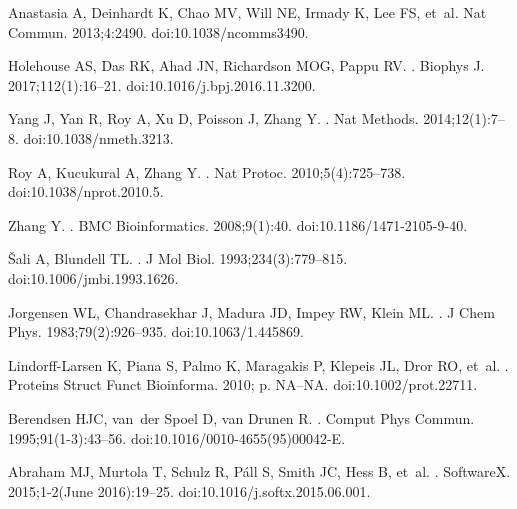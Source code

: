 \documentclass[10pt,letterpaper]{article}
\begin{document}
\begin{thebibliography}{10}
Anastasia A, Deinhardt K, Chao MV, Will NE, Irmady K, Lee FS, et~al.
\newblock Nat Commun. 2013;4:2490.
\newblock doi:{10.1038/ncomms3490}.

Holehouse AS, Das RK, Ahad JN, Richardson MOG, Pappu RV.
.
\newblock Biophys J. 2017;112(1):16--21.
\newblock doi:{10.1016/j.bpj.2016.11.3200}.

Yang J, Yan R, Roy A, Xu D, Poisson J, Zhang Y.
.
\newblock Nat Methods. 2014;12(1):7--8.
\newblock doi:{10.1038/nmeth.3213}.

Roy A, Kucukural A, Zhang Y.
.
\newblock Nat Protoc. 2010;5(4):725--738.
\newblock doi:{10.1038/nprot.2010.5}.

Zhang Y.
.
\newblock BMC Bioinformatics. 2008;9(1):40.
\newblock doi:{10.1186/1471-2105-9-40}.

{\v{S}}ali A, Blundell TL.
.
\newblock J Mol Biol. 1993;234(3):779--815.
\newblock doi:{10.1006/jmbi.1993.1626}.

Jorgensen WL, Chandrasekhar J, Madura JD, Impey RW, Klein ML.
.
\newblock J Chem Phys. 1983;79(2):926--935.
\newblock doi:{10.1063/1.445869}.

Lindorff-Larsen K, Piana S, Palmo K, Maragakis P, Klepeis JL, Dror RO, et~al.
.
\newblock Proteins Struct Funct Bioinforma. 2010; p. NA--NA.
\newblock doi:{10.1002/prot.22711}.

Berendsen HJC, van~der Spoel D, van Drunen R.
.
\newblock Comput Phys Commun. 1995;91(1-3):43--56.
\newblock doi:{10.1016/0010-4655(95)00042-E}.

Abraham MJ, Murtola T, Schulz R, P{\'{a}}ll S, Smith JC, Hess B, et~al.
.
\newblock SoftwareX. 2015;1-2(June 2016):19--25.
\newblock doi:{10.1016/j.softx.2015.06.001}.


\end{thebibliography}
\end{document}
